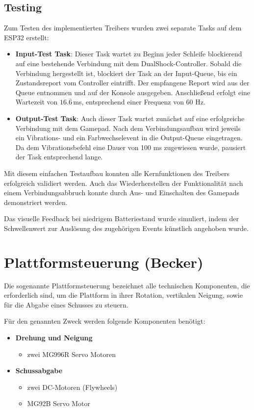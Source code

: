 \subsection{Testing}

Zum Testen des implementierten Treibers wurden zwei separate Tasks auf dem ESP32 erstellt:

\begin{itemize}
    \item \textbf{Input-Test Task}: Dieser Task wartet zu Beginn jeder Schleife blockierend auf eine bestehende Verbindung mit dem DualShock-Controller. 
    Sobald die Verbindung hergestellt ist, blockiert der Task an der Input-Queue, bis ein Zustandsreport vom Controller eintrifft. Der empfangene Report wird aus der Queue entnommen und auf der Konsole ausgegeben. 
    Anschließend erfolgt eine Wartezeit von $16.\overline{6}$\,ms, entsprechend einer Frequenz von 60 Hz.
    
    \item \textbf{Output-Test Task}: Auch dieser Task wartet zunächst auf eine erfolgreiche Verbindung mit dem Gamepad. 
    Nach dem Verbindungsaufbau wird jeweils ein Vibrations- und ein Farbwechselevent in die Output-Queue eingetragen. 
    Da dem Vibrationsbefehl eine Dauer von 100 ms zugewiesen wurde, pausiert der Task entsprechend lange.
\end{itemize}

Mit diesem einfachen Testaufbau konnten alle Kernfunktionen des Treibers erfolgreich validiert werden. 
Auch das Wiederherstellen der Funktionalität nach einem Verbindungsabbruch konnte durch Aus- und Einschalten des Gamepads demonstriert werden.

Das visuelle Feedback bei niedrigem Batteriestand wurde simuliert, indem der Schwellenwert zur Auslösung des zugehörigen Events künstlich angehoben wurde.

\section{Plattformsteuerung (Becker)}

Die sogenannte Plattformsteuerung bezeichnet alle technischen Komponenten, die erforderlich sind, um die Plattform in ihrer Rotation, vertikalen Neigung, sowie für die Abgabe eines Schusses zu steuern.

Für den genannten Zweck werden folgende Komponenten benötigt:

\begin{itemize}
    \item \textbf{Drehung und Neigung}
    \begin{itemize}
        \item zwei MG996R Servo Motoren
    \end{itemize}
    \item \textbf{Schussabgabe}
    \begin{itemize}
        \item zwei DC-Motoren (Flywheels)
        \item MG92B Servo Motor
    \end{itemize}
\end{itemize}

